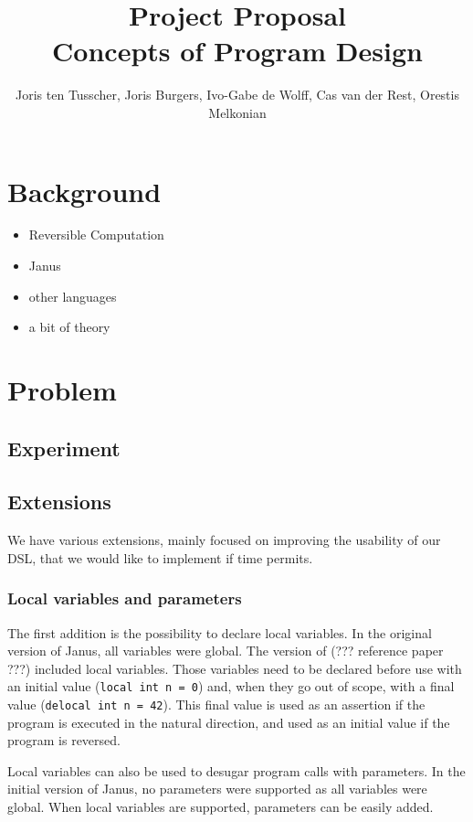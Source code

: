 \documentclass[12pt,a4paper]{article}
\title{\textbf{Project Proposal \\ \small{Concepts of Program Design}}}
\author{\small{Joris ten Tusscher, Joris Burgers, Ivo-Gabe de Wolff, Cas van der Rest, Orestis Melkonian}}
\date{}
\begin{document}
\maketitle

\section{Background}
\begin{itemize}
	\item{Reversible Computation}
	\item{Janus}
	\item{other languages}
	\item{a bit of theory}
\end{itemize}

\section{Problem}
	\subsection{Experiment}
	
	\subsection{Extensions}
	We have various extensions, mainly focused on improving the usability of our DSL, that we would like to implement if time permits.
	
	\subsubsection{Local variables and parameters}
	The first addition is the possibility to declare local variables. In the original version of Janus, all variables were global. The version of (??? reference paper ???) included local variables. Those variables need to be declared before use with an initial value (\texttt{local int n = 0}) and, when they go out of scope, with a final value (\texttt{delocal int n = 42}). This final value is used as an assertion if the program is executed in the natural direction, and used as an initial value if the program is reversed.
	
	Local variables can also be used to desugar program calls with parameters. In the initial version of Janus, no parameters were supported as all variables were global. When local variables are supported, parameters can be easily added.
	
\end{document}
